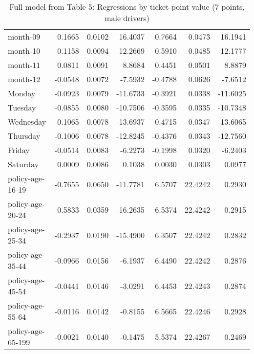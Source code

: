 \documentclass[10pt]{article}
\begin{document}
\begin{table}[ht]
\begin{tabular}{lrrrrrr}
  month-09 & 0.1665 & 0.0102 & 16.4037 & 0.7664 & 0.0473 & 16.1941 \\ 
  month-10 & 0.1158 & 0.0094 & 12.2669 & 0.5910 & 0.0485 & 12.1777 \\ 
  month-11 & 0.0811 & 0.0091 & 8.8684 & 0.4451 & 0.0501 & 8.8879 \\ 
  month-12 & -0.0548 & 0.0072 & -7.5932 & -0.4788 & 0.0626 & -7.6512 \\ 
  Monday & -0.0923 & 0.0079 & -11.6733 & -0.3921 & 0.0338 & -11.6025 \\ 
  Tuesday & -0.0855 & 0.0080 & -10.7506 & -0.3595 & 0.0335 & -10.7348 \\ 
  Wednesday & -0.1065 & 0.0078 & -13.6937 & -0.4715 & 0.0347 & -13.6065 \\ 
  Thursday & -0.1006 & 0.0078 & -12.8245 & -0.4376 & 0.0343 & -12.7560 \\ 
  Friday & -0.0514 & 0.0083 & -6.2273 & -0.1998 & 0.0320 & -6.2403 \\ 
  Saturday & 0.0009 & 0.0086 & 0.1038 & 0.0030 & 0.0303 & 0.0977 \\ 
  policy-age-16-19 & -0.7655 & 0.0650 & -11.7781 & 6.5707 & 22.4242 & 0.2930 \\ 
  policy-age-20-24 & -0.5833 & 0.0359 & -16.2635 & 6.5374 & 22.4242 & 0.2915 \\ 
  policy-age-25-34 & -0.2937 & 0.0190 & -15.4900 & 6.3507 & 22.4242 & 0.2832 \\ 
  policy-age-35-44 & -0.0966 & 0.0156 & -6.1937 & 6.4490 & 22.4242 & 0.2876 \\ 
  policy-age-45-54 & -0.0441 & 0.0146 & -3.0291 & 6.4453 & 22.4243 & 0.2874 \\ 
  policy-age-55-64 & -0.0116 & 0.0142 & -0.8155 & 6.5665 & 22.4246 & 0.2928 \\ 
  policy-age-65-199 & -0.0021 & 0.0140 & -0.1475 & 5.5374 & 22.4267 & 0.2469 \\ 
   \hline
\end{tabular}
\caption{Full model from Table 5: Regressions by ticket-point value (7 points, male drivers)} 
\label{tab_5_7_pts_M}
\end{table}


\clearpage
\pagebreak



\end{document}
